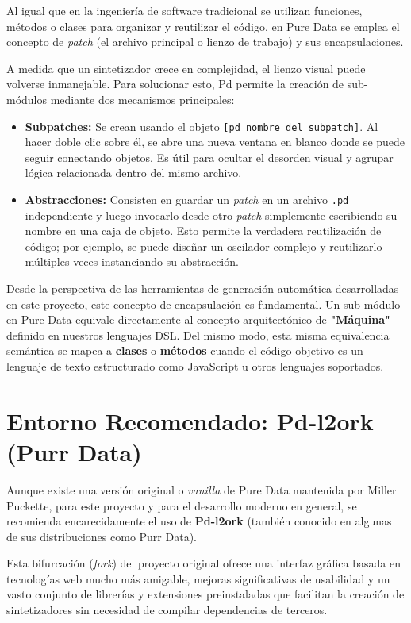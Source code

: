 Al igual que en la ingeniería de software tradicional se utilizan funciones, métodos o clases para organizar y reutilizar el código, en Pure Data se emplea el concepto de \textit{patch} (el archivo principal o lienzo de trabajo) y sus encapsulaciones.

A medida que un sintetizador crece en complejidad, el lienzo visual puede volverse inmanejable. Para solucionar esto, Pd permite la creación de sub-módulos mediante dos mecanismos principales:
\begin{itemize}
    \item \textbf{Subpatches:} Se crean usando el objeto \verb|[pd nombre_del_subpatch]|. Al hacer doble clic sobre él, se abre una nueva ventana en blanco donde se puede seguir conectando objetos. Es útil para ocultar el desorden visual y agrupar lógica relacionada dentro del mismo archivo.
    \item \textbf{Abstracciones:} Consisten en guardar un \textit{patch} en un archivo \texttt{.pd} independiente y luego invocarlo desde otro \textit{patch} simplemente escribiendo su nombre en una caja de objeto. Esto permite la verdadera reutilización de código; por ejemplo, se puede diseñar un oscilador complejo y reutilizarlo múltiples veces instanciando su abstracción.
\end{itemize}

Desde la perspectiva de las herramientas de generación automática desarrolladas en este proyecto, este concepto de encapsulación es fundamental. Un sub-módulo en Pure Data equivale directamente al concepto arquitectónico de \textbf{"Máquina"} definido en nuestros lenguajes DSL. Del mismo modo, esta misma equivalencia semántica se mapea a \textbf{clases} o \textbf{métodos} cuando el código objetivo es un lenguaje de texto estructurado como JavaScript u otros lenguajes soportados.

\section{Entorno Recomendado: Pd-l2ork (Purr Data)}

Aunque existe una versión original o \textit{vanilla} de Pure Data mantenida por Miller Puckette, para este proyecto y para el desarrollo moderno en general, se recomienda encarecidamente el uso de \textbf{Pd-l2ork} (también conocido en algunas de sus distribuciones como Purr Data). 

Esta bifurcación (\textit{fork}) del proyecto original ofrece una interfaz gráfica basada en tecnologías web mucho más amigable, mejoras significativas de usabilidad y un vasto conjunto de librerías y extensiones preinstaladas que facilitan la creación de sintetizadores sin necesidad de compilar dependencias de terceros.

